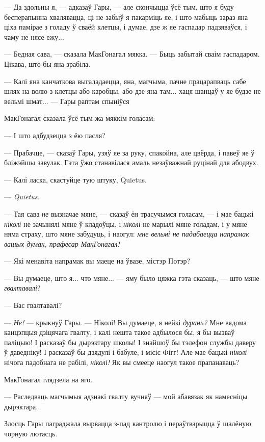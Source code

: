 --- Да здольны я, --- адказаў Гары, --- але скончыцца ўсё тым, што я буду бесперапынна
хвалявацца, ці не забыў я пакарміць яе, і што мабыць зараз яна ціха памірае з голаду
ў сваёй клетцы, і думае, дзе ж яе гаспадар падзяваўся, і чаму не нясе ежу...

--- Бедная сава, --- сказала МакГонагал мякка. --- Быць забытай сваім 
гаспадаром. Цікава, што бы яна зрабіла.

--- Калі яна канчаткова выгаладаецца, яна, магчыма, пачне працарапваць сабе шлях
на волю з клетцы або каробцы, або дзе яна там... хаця шанцаў у яе будзе
не вельмі шмат... --- Гары раптам спыніўся

МакГонагал сказала ўсё тым жа мяккім голасам:

--- І што адбудзецца з ёю пасля?

--- Прабачце, --- сказаў Гары, узяў яе за руку, спакойна, але цвёрда, і 
павеў яе ў бліжэйшы завулак. Гэта ўжо станавілася амаль незаўважнай руцінай для 
абодвух.

--- Калі ласка, скастуйце тую штуку, Quietus.

--- \emph{Quietus.}

--- Тая сава \emph{не} вызначае мяне, --- сказаў ён трасучымся голасам, --- і
мае бацькі \emph{ніколі} не зачынялі мяне ў кладоўцы, і \emph{ніколі} не марылі
мяне голадам, і у мяне няма страху, што мяне забудуць, і наогул: 
\emph{мне вельмі не падабаецца напрамак вашых думак, прафесар МакГонагал!}

--- Які менавіта напрамак вы маеце на ўвазе, містэр Потэр?

--- Вы думаеце, што я... что мяне... --- яму было цяжка гэта сказаць, ---
што мяне \emph{гвалтавалі}?

--- Вас гвалтавалі?

--- \emph{Не!} --- крыкнуў Гары. --- Ніколі! Вы думаеце, я нейкі \emph{дурань?} 
Мне вядома канцэпцыя дзіцячага гвалту, і калі нешта такое адбылося бы, я бы 
вызваў паліцыю! І расказаў бы дырэктару школы! І знайшоў бы тэлефон службы 
даверу ў даведніку! І расказаў бы дзядулі і бабуле, і місіс Фігг! 
Але мае бацькі \emph{ніколі} нічога падобнага не рабілі, \emph{ніколі!}
Як вы смееце наогул такое прапанаваць?

МакГонагал глядзела на яго.

--- Раследваць магчымыя адзнакі гвалту вучняў --- мой абавязак як намесніцы дырэктара.

Злосць Гары паграджала вырвацца з-пад кантролю і пераўтварыцца ў шалёную чорную
лютасць. 

